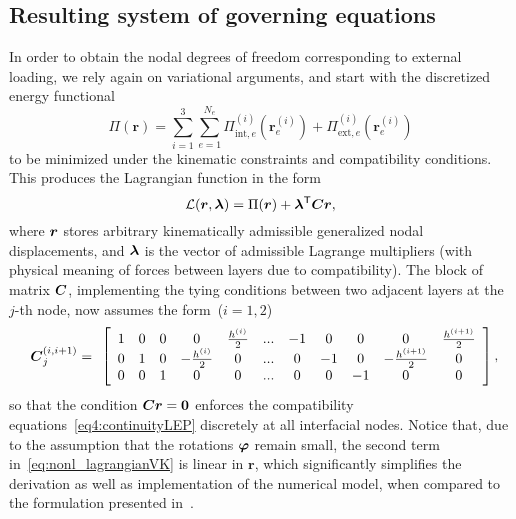 \documentclass[11pt]{article}
\newcommand{\rot}{\varphi}
\newcommand{\layer}[1]{^{(#1)}}
\newcommand{\lay}[1]{^{(#1)}}
\newcommand{\el}{_e}
\newcommand{\nel}{{N\el}}
\newcommand{\Etot}{\Pi}
\newcommand{\Eexte}[2]{\Etot\lay{#1}_{\mathrm{ext},#2}}
\newcommand{\Einte}[2]{\Etot\lay{#1}_{\mathrm{int},#2}}
\newcommand{\M}[1]{{\boldsymbol #1}}
\newcommand{\Md}{\M{r}}
\newcommand{\Mde}[2]{\Md^{(#1)}_{#2}}
\begin{document}
\subsection{Resulting system of governing equations}\label{sec:governing}
In order to obtain the nodal degrees of freedom corresponding to external loading, we rely again on
variational arguments, and start with the discretized energy functional
\begin{equation}\label{eq:EintVK}
\Etot( \Md )
=
\sum_{i=1}^{3}
\sum_{e=1}^{\nel}
\Einte{i}{e}( \Mde{i}{e} )
+
\Eexte{i}{e}( \Mde{i}{e} )
\end{equation}
to be minimized under the kinematic constraints and compatibility
conditions. This produces the Lagrangian function in the form
\begin{equation}\label{eq:nonl_lagrangianVK}
\mathcal{L}( \Md, \M{\lambda} )
=
\Etot( \Md )
+
\M{\lambda}\trn\M{C}\Md,
\end{equation}
where ${\boldsymbol{r}}$ stores arbitrary kinematically admissible generalized nodal displacements, and ${\boldsymbol{\lambda}}$ is the vector of admissible Lagrange
multipliers (with physical meaning of forces between layers due to compatibility).
The block of matrix ${\boldsymbol{C}}$, implementing the tying conditions between two adjacent layers at the $j$-th node, now assumes the form~($i=1,2$)
\begin{equation}
\begin{array}{c}
\mtrx{ C }\layer{i,i+1}_{j} =
\end{array}
\left[
 \begin{array}{ccccccccccc}
  1 & 0 & 0 &                     0 & \frac{h\layer{i}}{2} & ... & -1 &  0 &                       0 & 0 & \frac{h\layer{i+1}}{2} \\
  0 & 1 & 0 & -\frac{h\layer{i}}{2} &                    0 & ... &  0 & -1 &  0 & -\frac{h\layer{i+1}}{2}&                      0 \\
  0 & 0 & 1 &                     0 &                    0 & ... &  0 &  0 &                      -1 & 0 &                      0 \\
 \end{array}
\right],
\label{eq4:C1_LEP}
\end{equation}
so that the condition ${\boldsymbol{C}}{\boldsymbol{r}}={\boldsymbol{0}}$
enforces the compatibility equations~\eqref{eq4:continuityLEP} discretely at all interfacial nodes. 
Notice that, due to the assumption that the rotations $\mtrx{\rot}$ remain small, the second term in~\eqref{eq:nonl_lagrangianVK} is linear in $\Md$, which significantly simplifies the derivation as well as implementation of the numerical model, when compared to the formulation presented in~\cite{Zemanova:2014:NMFS}. 
\end{document}
